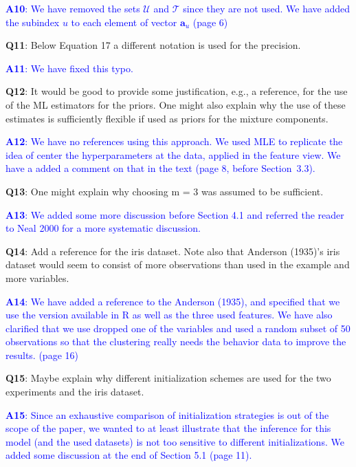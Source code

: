 \documentclass[]{article}
\begin{document}
	\textcolor{blue}{  
	\textbf{A10}: We have removed the sets $\mathcal{U}$ and $\mathcal{T}$ since they are not used. We have added the subindex $u$ to each element of vector $\mathbf{a}_u$ (page 6) 
	} 
	
	\vspace{3mm}
	\textbf{Q11}:  Below Equation 17 a different notation is used for the precision.

	\textcolor{blue}{  
	\textbf{A11}: We have fixed this typo.
	} 

	
	\vspace{3mm}
	\textbf{Q12}: It would be good to provide some justification, e.g., a reference, for the use of the ML estimators for the priors. One might also explain why the use of these estimates is sufficiently flexible if used as priors for the mixture components.

	\textcolor{blue}{  
	\textbf{A12}: We have no references using this approach.  We used MLE to replicate the idea of center the hyperparameters at the data, applied in the feature view.  We have a added a comment on that in the text (page 8, before Section~3.3).
	} 
	
	\vspace{3mm}
	\textbf{Q13}:  One might explain why choosing m = 3 was assumed to be sufficient.

	\textcolor{blue}{  
	\textbf{A13}: We added some more discussion before Section 4.1 and referred the reader to Neal 2000 for a more systematic discussion. 
	} 

	
	\vspace{3mm}
	\textbf{Q14}:  Add a reference for the iris dataset. Note also that Anderson (1935)'s iris dataset would seem to consist of more observations than used in the example and more variables.

	\textcolor{blue}{  
	\textbf{A14}: We have added a reference to the Anderson (1935), and specified that we use the version available in R as well as the three used features. We have also clarified that we use dropped one of the variables and used a random subset of 50 observations so that the clustering really needs the behavior data to improve the results.  (page 16)
	} 
	
	\vspace{3mm}
	\textbf{Q15}: Maybe explain why different initialization schemes are used for the two experiments and the iris dataset.

	\textcolor{blue}{  
	\textbf{A15}: Since an exhaustive comparison of initialization strategies is out of the scope of the paper, we wanted to at least illustrate that the inference for this model (and the used datasets) is not too sensitive to different initializations. We added some discussion at the end of Section 5.1 (page 11).
	} 
\end{document}
